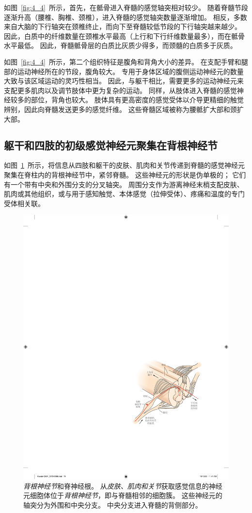如图~\ref{fig:4_4}~所示，首先，在骶骨进入脊髓的感觉轴突相对较少。
随着脊髓节段逐渐升高（腰椎、胸椎、颈椎），进入脊髓的感觉轴突数量逐渐增加。
相反，多数来自大脑的下行轴突在颈椎终止，而向下至脊髓较低节段的下行轴突越来越少。
因此，白质中的纤维数量在颈椎水平最高（上行和下行纤维数量最多），而在骶骨水平最低。
因此，脊髓骶骨层的白质比灰质少得多，而颈髓的白质多于灰质。


如图~\ref{fig:4_4}~所示，第二个组织特征是腹角和背角大小的差异。
在支配手臂和腿部的运动神经所在的节段，腹角较大。
专用于身体区域的腹侧运动神经元的数量大致与该区域运动的灵巧性相当。
因此，与躯干相比，需要更多的运动神经元来支配更多肌肉以及调节肢体中更为复杂的运动。
同样，从肢体进入脊髓的感觉神经较多的部位，背角也较大。
肢体具有更高密度的感觉受体以介导更精细的触觉辨别，因此向脊髓发送更多的感觉纤维。
这些脊髓区域被称为腰骶扩大部和颈扩大部。



\subsection{躯干和四肢的初级感觉神经元聚集在背根神经节}

如图~\ref{fig:4_5}~所示，将信息从四肢和躯干的皮肤、肌肉和关节传递到脊髓的感觉神经元聚集在脊柱内的背根神经节中，紧邻脊髓。
这些神经元的形状是伪单极的；
它们有一个带有中央和外围分支的分叉轴突。
周围分支作为游离神经末梢支配皮肤、肌肉或其他组织，或与用于感知触觉、本体感觉（拉伸受体）、疼痛和温度的专门受体相关联。


\begin{figure}[htbp]
	\centering
	\includegraphics[width=0.65\linewidth]{chap04/fig_4_5}
	\caption{\textit{背根神经节}和脊神经根。
		从\textit{皮肤、肌肉和关节}获取感觉信息的神经元细胞体位于\textit{背根神经节}，即与脊髓相邻的细胞簇。
		这些神经元的轴突分为外围和中央分支。 
		中央分支进入脊髓的背侧部分。}
	\label{fig:4_5}
\end{figure}


